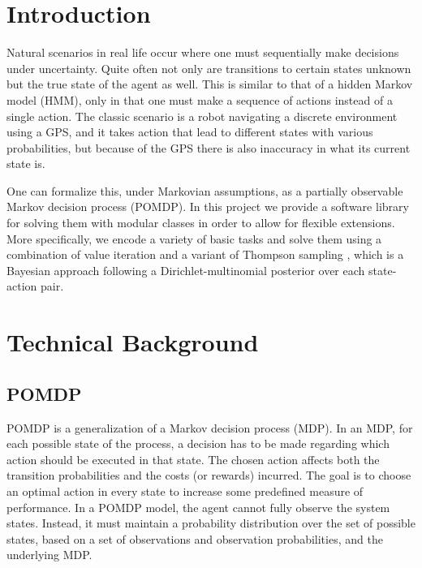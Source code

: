 \documentclass{pset}
\begin{document}

\section{Introduction}
Natural scenarios in real life occur where one must sequentially make decisions
under uncertainty. Quite often not only are transitions to certain states
unknown but the true state of the agent as well. This is similar to that of a
hidden Markov model (HMM), only in that one must make a sequence of actions
instead of a single action. The classic scenario is a robot navigating a
discrete environment using a GPS, and it takes action that lead to different
states with various probabilities, but because of the GPS there is also
inaccuracy in what its current state is.

One can formalize this, under Markovian assumptions, as a partially observable
Markov decision process (POMDP). In this project we provide a software
library for solving them with modular classes in order to allow for flexible
extensions.  More specifically, we encode a variety of basic tasks and solve
them using a combination of value iteration and a variant of Thompson sampling 
\cite{strens2000bayesian}, which is a Bayesian approach
following a Dirichlet-multinomial posterior over each state-action pair. 

\section{Technical Background}

\subsection{POMDP}
POMDP is a generalization of a Markov decision process (MDP). In an MDP, for each possible state of
the process, a decision has to be made regarding which action should be executed in that state. The
chosen action affects both the transition probabilities and the costs (or rewards) incurred. The
goal is to choose an optimal action in every state to increase some predefined measure of 
performance. In a POMDP model, the agent cannot fully observe the system states. 
Instead, it must maintain a probability distribution over the set of possible states, 
based on a set of observations and observation probabilities, and the underlying MDP.  
\end{document}
